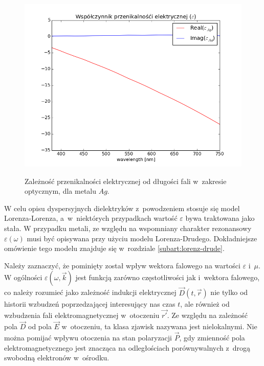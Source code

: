 \begin{figure}[tb]
	\includegraphics[width=\textwidth]{images/agtio2eps.png}
	\label{fig:agtio2eps}
	\caption{Zależność przenikalności elektrycznej od długości fali w~zakresie optycznym, dla metalu $Ag$\cite{PhysRevB.6.4370}. }  
\end{figure}
W celu opisu dyspersyjnych dielektryków z~powodzeniem stosuje się model Lorenza-Lorenza, a~w~niektórych przypadkach wartość $\varepsilon$ bywa traktowana jako stała. W przypadku metali, ze względu na wspomniany charakter rezonansowy $\varepsilon(\omega)$  musi być opisywana przy użyciu modelu Lorenza-Drudego. Dokładniejsze omówienie tego modelu znajduje się w~rozdziale \ref{subart:lorenz-drude}.

Należy zaznaczyć, że pominięty został wpływ wektora falowego na wartości $\varepsilon$ i~$\mu$. W ogólności $\varepsilon(\omega,\vec{k})$ jest funkcją zarówno częstotliwości jak i~wektora falowego, co należy rozumieć jako zależność indukcji elektrycznej $\vec{D}(t,\vec{r})$ nie tylko od historii wzbudzeń poprzedzającej interesujący nas czas $t$, ale również od wzbudzenia fali elektromagnetycznej w~otoczeniu $\vec{r'}$. Ze względu na zależność pola $\vec{D}$ od pola $\vec{E}$ w~otoczeniu, ta klasa zjawisk nazywana jest nielokalnymi. Nie można pomijać wpływu otoczenia na stan polaryzacji $\vec{P}$, gdy zmienność pola elektromagnetycznego jest znacząca na odległościach porównywalnych z~drogą swobodną elektronów w~ośrodku.



